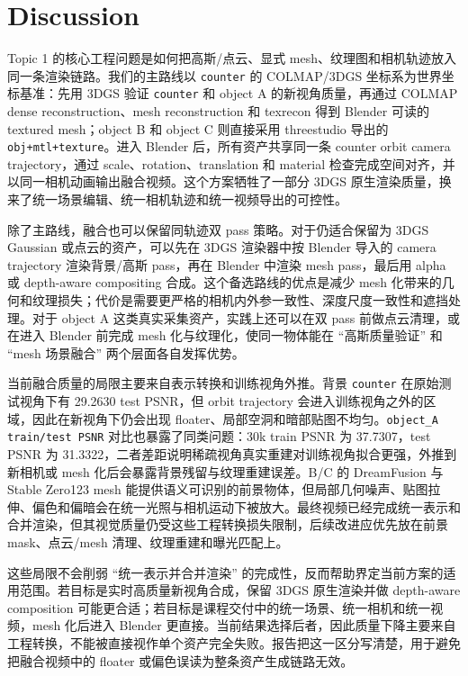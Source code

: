 \documentclass{article}
\begin{document}
	\FloatBarrier

	\section{Discussion}

	Topic 1 的核心工程问题是如何把高斯/点云、显式 mesh、纹理图和相机轨迹放入同一条渲染链路。我们的主路线以 \texttt{counter} 的 COLMAP/3DGS 坐标系为世界坐标基准：先用 3DGS 验证 \texttt{counter} 和 object A 的新视角质量，再通过 COLMAP dense reconstruction、mesh reconstruction 和 texrecon 得到 Blender 可读的 textured mesh；object B 和 object C 则直接采用 threestudio 导出的 \texttt{obj+mtl+texture}。进入 Blender 后，所有资产共享同一条 counter orbit camera trajectory，通过 scale、rotation、translation 和 material 检查完成空间对齐，并以同一相机动画输出融合视频。这个方案牺牲了一部分 3DGS 原生渲染质量，换来了统一场景编辑、统一相机轨迹和统一视频导出的可控性。

	除了主路线，融合也可以保留同轨迹双 pass 策略。对于仍适合保留为 3DGS Gaussian 或点云的资产，可以先在 3DGS 渲染器中按 Blender 导入的 camera trajectory 渲染背景/高斯 pass，再在 Blender 中渲染 mesh pass，最后用 alpha 或 depth-aware compositing 合成。这个备选路线的优点是减少 mesh 化带来的几何和纹理损失；代价是需要更严格的相机内外参一致性、深度尺度一致性和遮挡处理。对于 object A 这类真实采集资产，实践上还可以在双 pass 前做点云清理，或在进入 Blender 前完成 mesh 化与纹理化，使同一物体能在 ``高斯质量验证'' 和 ``mesh 场景融合'' 两个层面各自发挥优势。

	当前融合质量的局限主要来自表示转换和训练视角外推。背景 \texttt{counter} 在原始测试视角下有 29.2630 test PSNR，但 orbit trajectory 会进入训练视角之外的区域，因此在新视角下仍会出现 floater、局部空洞和暗部贴图不均匀。\verb|object_A train/test PSNR| 对比也暴露了同类问题：30k train PSNR 为 37.7307，test PSNR 为 31.3322，二者差距说明稀疏视角真实重建对训练视角拟合更强，外推到新相机或 mesh 化后会暴露背景残留与纹理重建误差。B/C 的 DreamFusion 与 Stable Zero123 mesh 能提供语义可识别的前景物体，但局部几何噪声、贴图拉伸、偏色和偏暗会在统一光照与相机运动下被放大。最终视频已经完成统一表示和合并渲染，但其视觉质量仍受这些工程转换损失限制，后续改进应优先放在前景 mask、点云/mesh 清理、纹理重建和曝光匹配上。

	这些局限不会削弱 ``统一表示并合并渲染'' 的完成性，反而帮助界定当前方案的适用范围。若目标是实时高质量新视角合成，保留 3DGS 原生渲染并做 depth-aware composition 可能更合适；若目标是课程交付中的统一场景、统一相机和统一视频，mesh 化后进入 Blender 更直接。当前结果选择后者，因此质量下降主要来自工程转换，不能被直接视作单个资产完全失败。报告把这一区分写清楚，用于避免把融合视频中的 floater 或偏色误读为整条资产生成链路无效。
\end{document}
